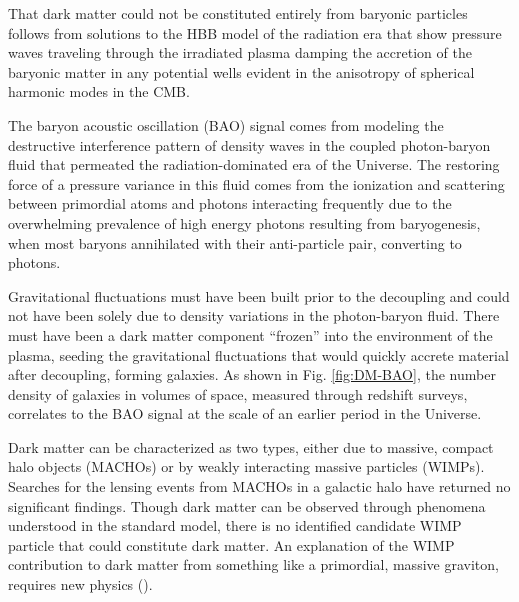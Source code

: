 \documentclass{paper}
\begin{document}
  That dark matter could not be constituted entirely from baryonic particles
  follows from solutions to the HBB model of the radiation era that show 
  pressure waves traveling through the irradiated plasma damping the accretion 
  of the baryonic matter in any potential wells evident in the anisotropy of 
  spherical harmonic modes in the CMB.

  The baryon acoustic oscillation (BAO) signal comes from modeling the 
  destructive interference pattern of density waves in the coupled 
  photon-baryon fluid that permeated the radiation-dominated era of the 
  Universe. The restoring force of a pressure variance in this fluid comes 
  from the ionization and scattering between primordial atoms and photons 
  interacting frequently due to the overwhelming prevalence of high energy 
  photons resulting from baryogenesis, when most baryons annihilated with 
  their anti-particle pair, converting to photons.

  Gravitational fluctuations must have been built prior to the decoupling and 
  could not have been solely due to density variations in the photon-baryon 
  fluid.  There must have been a dark matter component ``frozen'' into the 
  environment of the plasma, seeding the gravitational fluctuations that would 
  quickly accrete material after decoupling, forming galaxies.  As shown in 
  Fig. \ref{fig:DM-BAO}, the number density of galaxies in volumes of space, 
  measured through redshift surveys, correlates to the BAO signal at the scale 
  of an earlier period in the Universe.

  Dark matter can be characterized as two types, either due to massive, 
  compact halo objects (MACHOs) or by weakly interacting massive particles 
  (WIMPs). Searches for the lensing events from MACHOs in a galactic halo have 
  returned no significant findings. Though dark matter can be observed through 
  phenomena understood in the standard model, there is no identified candidate 
  WIMP particle that could constitute dark matter. An explanation of the WIMP 
  contribution to dark matter from something like a primordial, massive 
  graviton, requires new physics (\cite{PhysRevLett.128.081806}).
\end{document}
